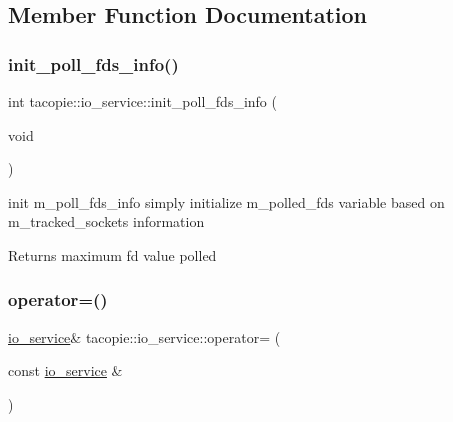 \subsection{Member Function Documentation}
\mbox{\label{classtacopie_1_1io__service_a7311358423dddd6a9d17c61b2c365ff8}} 
\subsubsection{\texorpdfstring{init\+\_\+poll\+\_\+fds\+\_\+info()}{init\_poll\_fds\_info()}}
{\footnotesize\ttfamily int tacopie\+::io\+\_\+service\+::init\+\_\+poll\+\_\+fds\+\_\+info (\begin{DoxyParamCaption}\item[{void}]{ }\end{DoxyParamCaption})\hspace{0.3cm}{\ttfamily [private]}}

init m\+\_\+poll\+\_\+fds\+\_\+info simply initialize m\+\_\+polled\+\_\+fds variable based on m\+\_\+tracked\+\_\+sockets information

\begin{DoxyReturn}{Returns}
maximum fd value polled 
\end{DoxyReturn}
\mbox{\label{classtacopie_1_1io__service_a980652008516b38357d405c16eda07fa}} 
\subsubsection{\texorpdfstring{operator=()}{operator=()}}
{\footnotesize\ttfamily \hyperlink{classtacopie_1_1io__service}{io\+\_\+service}\& tacopie\+::io\+\_\+service\+::operator= (\begin{DoxyParamCaption}\item[{const \hyperlink{classtacopie_1_1io__service}{io\+\_\+service} \&}]{ }\end{DoxyParamCaption})\hspace{0.3cm}{\ttfamily [delete]}}



